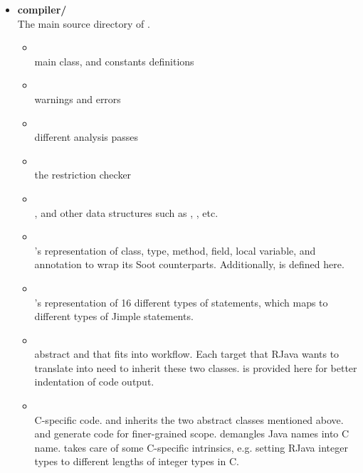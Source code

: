\documentclass[12pt]{article}
\begin{document}
\begin{itemize}
\item
\textbf{compiler/\\}
The main source directory of \rjc. 
  \begin{itemize}
  
  \item {}\\
   main class, 
   and constants definitions
  
  \item {}\\
  \rjc warnings and errors
  
  \item {}\\
  different analysis passes
  
  \item {}\\
  the restriction checker
  
  \item {}\\
  ,  
  and other data structures
  such as , , etc.

  \item {}\\
  \rjc 's representation of class, type, method, field, local variable, 
  and annotation to wrap its Soot counterparts. Additionally, 
   is defined here. 
  
  \item {}\\
  \rjc's representation of 16 different types of statements, which
  maps to different types of Jimple statements.
  
  \item {}\\
  abstract  and 
   that fits 
  into \rjc workflow. Each target that RJava wants to translate into
  need to inherit these two classes. 
   is provided here for better indentation
  of code output. 
  
  \item {}\\
  C-specific code.  and
   inherits the two abstract classes
  mentioned above.  and 
  generate code for finer-grained scope.  demangles
  Java names into C name.  takes care of some
  C-specific intrinsics, e.g. setting RJava integer types
  to different lengths of integer types in C. 
  

\end{itemize}
\end{itemize}
\end{document}
